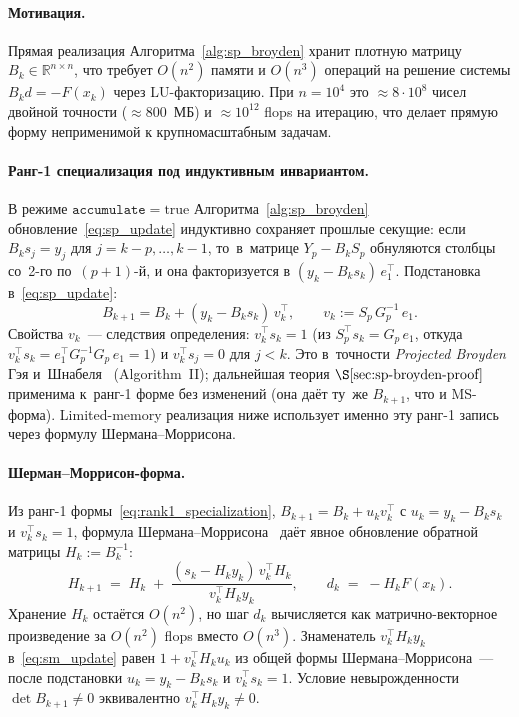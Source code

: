 \paragraph{Мотивация.} Прямая реализация Алгоритма~\ref{alg:sp_broyden}
хранит плотную матрицу $B_k\in\mathbb R^{n\times n}$, что требует
$O(n^2)$ памяти и $O(n^3)$ операций на решение системы $B_k d = -F(x_k)$
через LU-факторизацию. При $n=10^4$ это $\approx 8\cdot 10^8$ чисел
двойной точности ($\approx 800$~МБ) и $\approx 10^{12}$ flops на
итерацию, что делает прямую форму неприменимой к крупномасштабным
задачам.

\paragraph{Ранг-1 специализация под индуктивным инвариантом.}
В режиме $\mathtt{accumulate}=\text{true}$ Алгоритма~\ref{alg:sp_broyden}
обновление~\eqref{eq:sp_update} индуктивно сохраняет прошлые секущие:
если $B_k s_j = y_j$ для $j = k{-}p,\ldots,k{-}1$, то~в~матрице
$Y_p - B_k S_p$ обнуляются столбцы со~2-го по~$(p{+}1)$-й, и она
факторизуется в $(y_k - B_k s_k)\,e_1^\top$. Подстановка в~\eqref{eq:sp_update}:
\begin{equation}\label{eq:rank1_specialization}
  B_{k+1} = B_k + (y_k - B_k s_k)\,v_k^\top,
  \qquad
  v_k := S_p\,G_p^{-1}\,e_1.
\end{equation}
Свойства $v_k$~--- следствия определения: $v_k^\top s_k = 1$ (из
$S_p^\top s_k = G_p\,e_1$, откуда $v_k^\top s_k = e_1^\top G_p^{-1} G_p\,e_1 = 1$)
и $v_k^\top s_j = 0$ для $j<k$. Это в~точности \emph{Projected Broyden}
Гэя и~Шнабеля~\cite{gay_schnabel1978} (Algorithm~II); дальнейшая теория
$\S\ref{sec:sp-broyden-proof}$ применима к~ранг-1 форме без изменений
(она даёт ту~же $B_{k+1}$, что и MS-форма). Limited-memory реализация
ниже использует именно эту ранг-1 запись через формулу Шермана--Моррисона.

\paragraph{Шерман--Моррисон-форма.}
Из ранг-1 формы~\eqref{eq:rank1_specialization}, $B_{k+1} = B_k + u_k v_k^\top$
с $u_k = y_k - B_k s_k$ и $v_k^\top s_k = 1$,
формула Шермана--Моррисона~\cite[Lemma~8.3.1]{dennis1996} даёт явное
обновление обратной матрицы $H_k := B_k^{-1}$:
\begin{equation}\label{eq:sm_update}
   H_{k+1} \;=\; H_k \;+\; \frac{(s_k - H_k y_k)\,v_k^{\top} H_k}
                                 {v_k^{\top} H_k y_k},
   \qquad
   d_k \;=\; -H_k F(x_k).
\end{equation}
Хранение $H_k$ остаётся $O(n^2)$, но шаг $d_k$ вычисляется как
матрично-векторное произведение за $O(n^2)$ flops вместо $O(n^3)$.
Знаменатель $v_k^{\top} H_k y_k$ в~\eqref{eq:sm_update} равен
$1 + v_k^{\top} H_k u_k$ из общей формы
Шермана--Моррисона~--- после подстановки $u_k = y_k - B_k s_k$ и
$v_k^{\top} s_k = 1$. Условие невырожденности $\det B_{k+1} \ne 0$
эквивалентно $v_k^{\top} H_k y_k \ne 0$.

